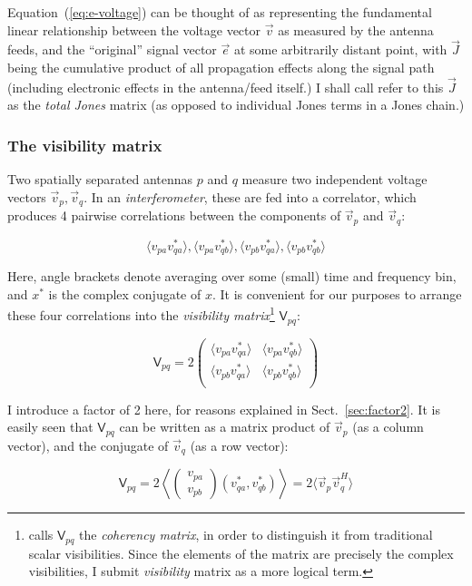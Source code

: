 \documentclass[]{aa}
\newcommand{\matrixtt}[4]{\left( \begin{array}{cc}#1&#2\\#3&#4\\\end{array} \right)}
\newcommand{\herm}{H}
\newcommand{\jones}[2]{\vec {#1}_{#2}}
\newcommand{\coh}[2]{\mathsf{{#1}}_{{#2}}}
\begin{document}
Equation~(\ref{eq:e-voltage}) can be thought of as representing the fundamental linear relationship between the voltage vector $\vec v$ as measured by the antenna feeds, and the ``original'' signal vector $\vec e$ at some arbitrarily distant point, with $\jones{J}{}$ being the cumulative product of all propagation effects along the signal path (including electronic effects in the antenna/feed itself.) I shall call refer to this $\jones{J}{}$ as the {\em total Jones} matrix (as opposed to individual Jones terms in a Jones chain.) 

\subsubsection{The visibility matrix}

Two spatially separated antennas $p$ and $q$ measure two independent voltage vectors $\vec v_p,\vec v_q$. In an {\em interferometer}, these are fed into a correlator, which produces 4 pairwise correlations between the components of $\vec v_p$ and $\vec v_q$:

    \begin{equation}\label{eq:correlation}
    \langle v_{pa}v^*_{qa}\rangle, \langle v_{pa}v^*_{qb}\rangle, 
    \langle v_{pb}v^*_{qa}\rangle, \langle v_{pb}v^*_{qb}\rangle
    \end{equation}

Here, angle brackets denote averaging over some (small) time and frequency bin, and $x^*$ is the complex conjugate of $x$.  It is convenient for our purposes to arrange these four correlations into the {\em visibility matrix\/}\footnote{\citet{ME4} calls $\coh{V}{pq}$ the {\em coherency matrix}, in order to distinguish it from traditional scalar visibilities. Since the elements of the matrix are precisely the complex visibilities, I submit {\em visibility} matrix as a more logical term.} $\coh{V}{pq}$:

    \[
    \coh{V}{pq} = 2 \matrixtt{\langle v_{pa}v^*_{qa}\rangle}{\langle v_{pa}v^*_{qb}\rangle}{\langle v_{pb}v^*_{qa}\rangle}{\langle v_{pb}v^*_{qb}\rangle}
    \]

I introduce a factor of 2 here, for reasons explained in Sect.~\ref{sec:factor2}. It is easily seen that $\coh{V}{pq}$ can be written as a matrix product of $\vec v_p$ (as a column vector), and the conjugate of $\vec v_q$ (as a row vector):

\begin{equation}\label{eq:coherency}
\coh{V}{pq} = 2 \left<\left( \begin{array}{c}v_{pa}\\v_{pb}\end{array} \right) (v^*_{qa},v^*_{qb}) \right > = 2 \langle \vec v_p \vec v^\herm_q \rangle
\end{equation}
\end{document}
